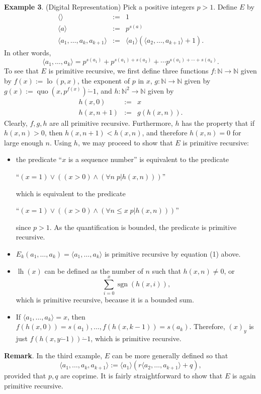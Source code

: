 \documentclass[12pt]{article}
\begin{document}
\textbf{Example 3}.  (Digital Representation)  Pick a positive integers $p>1$.  Define $E$ by
\begin{eqnarray*}
\langle \rangle &:=& 1 \\
\langle a \rangle &:=& p^{s(a)} \\
\langle a_1 , \ldots, a_k, a_{k+1} \rangle &:=&  \langle a_1 \rangle(\langle a_2,\ldots, a_{k+1} \rangle +1).
\end{eqnarray*}
In other words, 
\begin{equation}
\langle a_1 , \ldots, a_k \rangle = p^{s(a_1)} + p^{s(a_1)+s(a_2)} + \cdots p^{s(a_1) + \cdots + s(a_k)}.
\end{equation}
To see that $E$ is primitive recursive, we first define three functions $f:\mathbb{N}\to \mathbb{N}$ given by $f(x):=\operatorname{lo}(p,x)$, the exponent of $p$ in $x$, $g:\mathbb{N}\to \mathbb{N}$ given by $g(x):=\operatorname{quo}(x,p^{f(x)})\dot{-}1$, and $h:\mathbb{N}^2 \to \mathbb{N}$ given by
\begin{eqnarray*}
h(x,0) &:=& x \\
h(x,n+1) &:=&  g(h(x,n)).
\end{eqnarray*}
Clearly, $f,g,h$ are all primitive recursive.  Furthermore, $h$ has the property that if $h(x,n)>0$, then $h(x,n+1)<h(x,n)$, and therefore $h(x,n)=0$ for large enough $n$.  Using $h$, we may proceed to show that $E$ is primitive recursive:
\begin{itemize}
\item the predicate ``$x$ is a sequence number'' is equivalent to the predicate 
\begin{center}
``$(x=1) \vee ((x>0) \wedge (\forall n \; p|h(x,n)))$'' 
\end{center} which is equivalent to the predicate
\begin{center}
``$(x=1) \vee ((x>0) \wedge (\forall n\le x \; p|h(x,n)))$'' 
\end{center} 
since $p>1$.  As the quantification is bounded, the predicate is primitive recursive.
\item $E_k(a_1,\ldots,a_k)=\langle a_1,\ldots, a_k\rangle$ is primitive recursive by equation (1) above.
\item $\operatorname{lh}(x)$ can be defined as the number of $n$ such that $h(x,n)\ne 0$, or $$\sum_{i=0}^x \operatorname{sgn}(h(x,i)),$$ which is primitive recursive, because it is a bounded sum.
\item If $\langle a_1, \ldots, a_k \rangle =x$, then $f(h(x,0))=s(a_1), \ldots, f(h(x,k-1))=s(a_k)$.  Therefore, $(x)_y$ is just $f(h(x,y\dot{-}1))\dot{-}1$, which is primitive recursive.
\end{itemize}

\textbf{Remark}.  In the third example, $E$ can be more generally defined so that $$\langle a_1 , \ldots, a_k, a_{k+1} \rangle :=  \langle a_1 \rangle(r\langle a_2,\ldots, a_{k+1} \rangle +q),$$ provided that $p,q$ are coprime.  It is fairly straightforward to show that $E$ is again primitive recursive.
\end{document}
